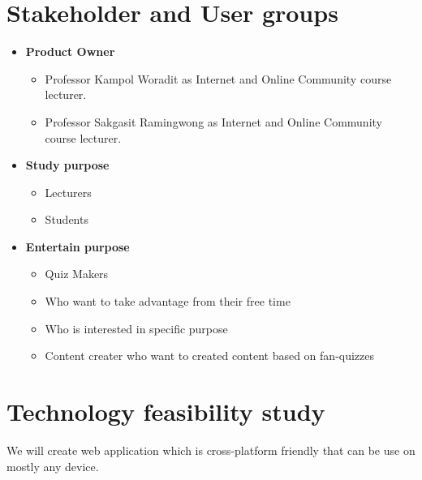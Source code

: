 \documentclass[a4paper, 12pt]{report}
\begin{document}
    \pagebreak
    \section*{Stakeholder and User groups}
        \begin{itemize}
            \item \textbf{Product Owner}
            \begin{itemize}
                \item Professor Kampol Woradit as Internet and Online Community course lecturer. 
                \item Professor Sakgasit Ramingwong as Internet and Online Community course lecturer. 
            \end{itemize}
            \item \textbf{Study purpose}
            \begin{itemize}
                \item Lecturers
                \item Students
            \end{itemize}
            \item \textbf{Entertain purpose}
            \begin{itemize}
                \item Quiz Makers
                \item Who want to take advantage from their free time
                \item Who is interested in specific purpose
                \item Content creater who want to created content based on fan-quizzes
            \end{itemize}
        \end{itemize}
    

    \pagebreak
    \section*{Technology feasibility study}
    We will create web application which is cross-platform friendly that can be use on mostly any device.

\end{document}

